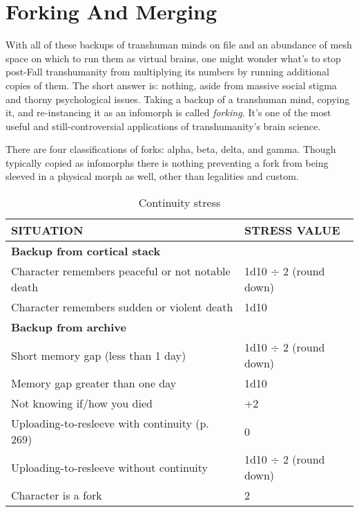 \section{Forking And Merging} 

With all of these backups of transhuman minds on file and an abundance of mesh space on which to run them as virtual brains, one might wonder what's to stop post-Fall transhumanity from multiplying its numbers by running additional copies of them. The short answer is: nothing, aside from massive social stigma and thorny psychological issues. Taking a backup of a transhuman mind, copying it, and re-instancing it as an infomorph is called \textit{forking.} It's one of the most useful and still-controversial applications of transhumanity's brain science. 

There are four classifications of forks: alpha, beta, delta, and gamma. Though typically copied as infomorphs there is nothing preventing a fork from being sleeved in a physical morph as well, other than legalities and custom. 

\begin{table} \caption{Continuity stress} \begin{tabular}{|l|l|} \hline

SITUATION &STRESS VALUE \\ \hline

\textbf{Backup from cortical stack} &\\ \hline

Character remembers peaceful or not notable death &1d10 $\div$ 2 (round down) \\ \hline

Character remembers sudden or violent death &1d10 \\ \hline

\textbf{Backup from archive} &\\ \hline

Short memory gap (less than 1 day) &1d10 $\div$ 2 (round down) \\ \hline

Memory gap greater than one day &1d10 \\ \hline

Not knowing if/how you died &+2 \\ \hline

Uploading-to-resleeve with continuity (p. 269) &0 \\ \hline

Uploading-to-resleeve without continuity &1d10 $\div$ 2 (round down) \\ \hline

Character is a fork &2 \\ \hline

\end{tabular} \label{table:continuity-stress} \end{table} 

